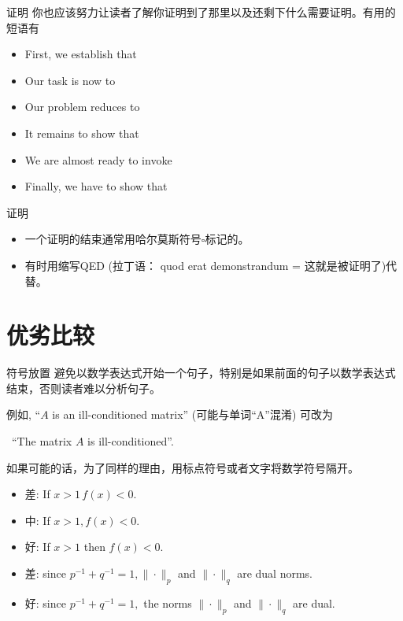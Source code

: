 \documentclass{ctexbeamer}
\begin{document}
\begin{frame}{证明}
	你也应该努力让读者了解你证明到了那里以及还剩下什么需要证明。有用的短语有
	\begin{itemize}
		\item First, we establish that
		\item Our task is now to
		\item Our problem reduces to
		\item It remains to show that
		\item We are almost ready to invoke
		\item Finally, we have to show that
	\end{itemize}
\end{frame}

\begin{frame}{证明}
	\begin{itemize}
		\item
		一个证明的结束通常用哈尔莫斯符号$\square$标记的。
		\item
		有时用缩写QED  (拉丁语： quod erat demonstrandum = 这就是被证明了)代替。
	\end{itemize}
\end{frame}


\section{优劣比较}

\begin{frame}{符号放置}
	避免以数学表达式开始一个句子，特别是如果前面的句子以数学表达式结束，否则读者难以分析句子。

	例如, ``$A$ is  an ill-conditioned matrix''
	(可能与单词``A''混淆)
	可改为\pause

	 \qquad 	 \ ``The matrix $A$ is   ill-conditioned''.
\vspace{10pt}

如果可能的话，为了同样的理由，用标点符号或者文字将数学符号隔开。

	\begin{itemize}
\item 差: If $x>1 \, f(x)<0$.\pause

\item 中: If $x>1, f(x)<0$. \pause

\item  好: If $x>1$ then $f(x)<0$.
	\end{itemize}

\vspace{10pt}

	\begin{itemize}
	\item
差: since $p^{-1}+q^{-1}=1,\|\cdot\|_{p}$ and $\|\cdot\|_{q}$ are dual norms. \pause

\item  好: since $p^{-1}+q^{-1}=1,$ the norms $\|\cdot\|_{p}$ and $\|\cdot\|_{q}$ are dual.
	\end{itemize}
\vspace{10pt}
\end{frame}
\end{document}
